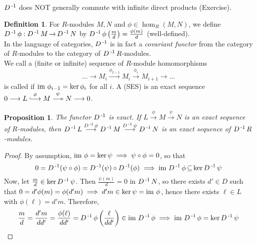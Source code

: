 \documentclass[11pt]{book}
\newcounter{counter}
\newtheorem{proposition}[counter]{Proposition}   \newtheorem{problem}[counter]{Problem}   \newtheorem*{proposition*}{Proposition}   \newtheorem*{lemma*}{Lemma}
\theoremstyle{definition}   \newtheorem{defn}[counter]{Definition} %
\newcommand{\hooklongrightarrow}{\lhook\joinrel\longrightarrow}   \newcommand{\twoheadlongrightarrow}{\relbar\joinrel\twoheadrightarrow}
\newcommand{\mses}[5]{0 \longrightarrow #1 \overset{#2}{\hooklongrightarrow} #3 \overset{#4}{\twoheadlongrightarrow} #5 \longrightarrow 0}
\DeclareMathOperator{\ra}{\rightarrow}   \DeclareMathOperator{\Poly}{\mathbf{P}}   \DeclareMathOperator{\spn}{\textnormal{span}}   \DeclareMathOperator{\aut}{\textnormal{Aut}}
\newcommand{\vs}{\vspace{8pt}}
\numberwithin{counter}{chapter}
\begin{document}
\vs

\begin{remark}
$D\operatorname{^{-1}}$ does NOT generally commute with infinite direct products (Exercise).
\end{remark}

\vs

\begin{defn}
For $R$-modules $M,N$ and $\phi \in \hom_R(M,N)$, we define $D\inv \phi : D\inv M \ra D\inv N$ by $D\operatorname{^{-1}}\phi \left(\frac{m}{d}\right) = \frac{\phi(m)}{d}$ (well-defined). \\

In the language of categories, $D\operatorname{^{-1}}$ is in fact a \emph{covariant functor} from the category of $R$-modules to the category of $D\operatorname{^{-1}} R$-modules. \\

We call a (finite or infinite) sequence of $R$-module homomorphisms
	\[...\longrightarrow M_i \overset{\phi_{I-1}}{\longrightarrow} M_i \overset{\phi_i}{\longrightarrow} M_{i+1} \longrightarrow \dots \]
is called  if $\textnormal{im } \phi_{i-1} = \ker \phi_i$ for all $i$. A  (SES) is an exact sequence \\ $\mses{L}{\phi}{M}{\psi}{N}$.
\end{defn}

\vs

\begin{proposition}
The functor $D\operatorname{^{-1}}$ is exact. If $L \overset{\phi}{\longrightarrow} M \overset{\psi}{\longrightarrow} N$ is an exact sequence of $R$-modules, then $D\operatorname{^{-1}} L \overset{D\operatorname{^{-1}} \phi}{\longrightarrow} D\operatorname{^{-1}} M \overset{D\operatorname{^{-1}} \psi}{\longrightarrow} D\operatorname{^{-1}} N$ is an exact sequence of $D\operatorname{^{-1}} R$-modules.
\end{proposition}

\begin{proof}
By assumption, $\textnormal{im } \phi = \ker \psi \implies \psi \circ \phi = 0$, so that
	\[0 = D\operatorname{^{-1}}(\psi \circ \phi) = D\operatorname{^{-1}}(\psi) \circ D\operatorname{^{-1}}(\phi) \implies \textnormal{im } D\operatorname{^{-1}} \phi \operatorname{\subseteq} \ker D\operatorname{^{-1}} \psi \]
Now, let $\frac{m}{d} \in \ker D\operatorname{^{-1}} \psi$. Then $\frac{\psi(m)}{d} = 0$ in $D\operatorname{^{-1}} N$, so there exists $d' \in D$ such that $0 = d'\phi(m) = \phi(d'm) \implies d'm \in \ker \psi = \textnormal{im } \phi$, hence there exists $\ell \in L$ with $\phi(\ell) = d'm$. Therefore,
	\[\frac{m}{d} = \frac{d'm}{dd'} = \frac{\phi(\ell)}{dd'} = D\operatorname{^{-1}} \phi \left(\frac{\ell}{dd'} \right) \in \textnormal{im } D\operatorname{^{-1}} \phi \implies \textnormal{im } D\operatorname{^{-1}} \phi = \ker D\operatorname{^{-1}} \psi \]
\end{proof}
\end{document}
